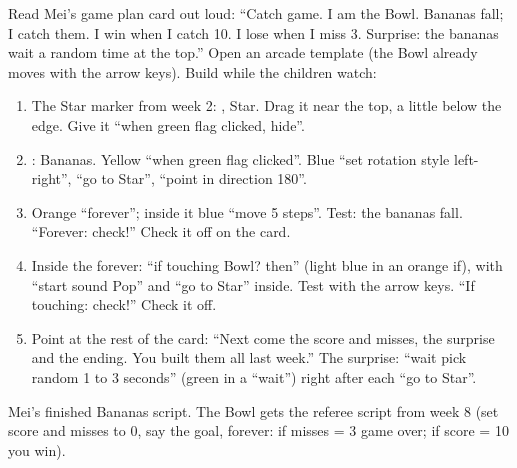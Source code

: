 \begin{workedexample}
Read Mei's game plan card out loud: \enquote{Catch game. I am the Bowl. Bananas fall; I catch them. I win when I catch 10. I lose when I miss 3. Surprise: the bananas wait a random time at the top.} Open an arcade template (the Bowl already moves with the arrow keys). Build while the children watch:
\begin{enumerate}[leftmargin=1.4em,itemsep=1pt]
  \item The Star marker from week 2: , Star. Drag it near the top, a little below the edge. Give it \enquote{when green flag clicked, hide}.
  \item {}: Bananas. Yellow  \enquote{when green flag clicked}. Blue  \enquote{set rotation style left-right}, \enquote{go to Star}, \enquote{point in direction 180}.
  \item Orange  \enquote{forever}; inside it blue  \enquote{move 5 steps}. Test: the bananas fall. \enquote{Forever: check!} Check it off on the card.
  \item Inside the forever: \enquote{if touching Bowl? then} (light blue  in an orange  if), with \enquote{start sound Pop} and \enquote{go to Star} inside. Test with the arrow keys. \enquote{If touching: check!} Check it off.
  \item Point at the rest of the card: \enquote{Next come the score and misses, the surprise and the ending. You built them all last week.} The surprise: \enquote{wait pick random 1 to 3 seconds} (green  in a \enquote{wait}) right after each \enquote{go to Star}.
\end{enumerate}
\begin{center}
\begin{scratch}[scale=0.85]
\end{scratch}
\end{center}
Mei's finished Bananas script. The Bowl gets the referee script from week 8 (set score and misses to 0, say the goal, forever: if misses = 3 game over; if score = 10 you win).
\end{workedexample}

